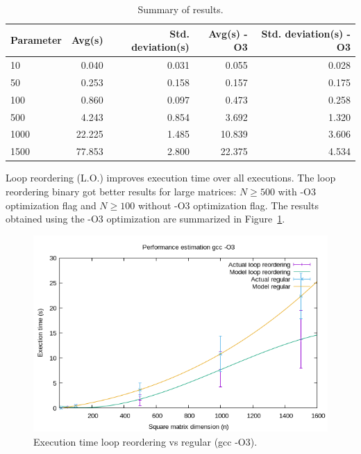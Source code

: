 \documentclass[12pt]{article}
\begin{document}
\begin{table}[h!]
	\centering
    \begin{tabular}{|l|r|r|r|r|} 
		\hline
		Parameter & Avg(s) & Std. deviation(s) & Avg(s) -O3 & Std. deviation(s) -O3 \\ [0.5ex] 
		\hline
		10 & 0.040 & 0.031 & 0.055 & 0.028 \\
		50 & 0.253 & 0.158 & 0.157 & 0.175 \\
		100 & 0.860 & 0.097 & 0.473 & 0.258 \\
		500 & 4.243 & 0.854 & 3.692 & 1.320 \\
		1000 & 22.225 & 1.485 & 10.839 & 3.606 \\
		1500 & 77.853 & 2.800 & 22.375 & 4.534 \\
		\hline
	\end{tabular}
	\caption{Summary of results.}
	\label{tab:results}
\end{table}

\newpage

Loop reordering (L.O.) improves execution time over all executions. The loop reordering binary got better results for large matrices: $ N \geq 500 $ with -O3 optimization flag and $ N \geq 100 $ without -O3 optimization flag. The results obtained using the -O3 optimization are summarized in Figure~\ref{fig:exectimeb}.

\begin{figure}[h!]
	\centering
	\includegraphics[width=0.9\linewidth]{q2-loop.png}
	\caption{Execution time loop reordering vs regular (gcc -O3).}
	\label{fig:exectimeb}
\end{figure}
\end{document}
